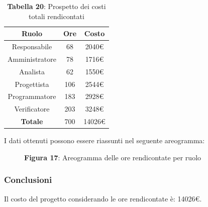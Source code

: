 \begin{table}[H]
	\centering
	\renewcommand{\arraystretch}{1.5}
	\begin{tabular}{|c|c|c|}
		\hline
		\rowcolor{lighter-grayer}
Ruolo & Ore & Costo \\ \hline
Responsabile & 68 & 2040\euro \\ \hline
Amministratore & 78 & 1716\euro \\ \hline
Analista & 62 & 1550\euro \\ \hline
Progettista & 106 & 2544\euro \\ \hline
Programmatore & 183 & 2928\euro \\ \hline
Verificatore & 203 & 3248\euro \\ \hline
\textbf{Totale} & 700 & 14026\euro \\ \hline
	\end{tabular}
	\caption*{\textbf{Tabella 20}: Prospetto dei costi totali rendicontati \\}
\end{table}

I dati ottenuti possono essere riassunti nel seguente areogramma:


\begin{figure}[H]
	\centering
	\caption*{\textbf{Figura 17}: Areogramma delle ore rendicontate per ruolo}
    \label{fig:Figura10}
\end{figure}

\subsubsection{Conclusioni}
Il costo del progetto considerando le ore rendicontate è: 14026\euro.